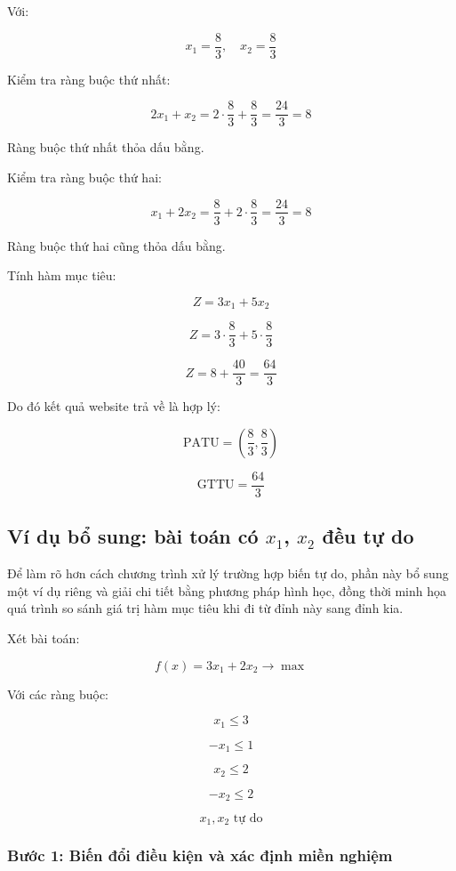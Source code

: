 \documentclass[14pt, a4paper]{extarticle}
\renewcommand{\frac}{\dfrac}
\begin{document}
    Với:
    
    \[
    x_1 = \frac{8}{3}, \quad x_2 = \frac{8}{3}
    \]
    
    Kiểm tra ràng buộc thứ nhất:
    
    \[
    2x_1+x_2 = 2\cdot\frac{8}{3}+\frac{8}{3}=\frac{24}{3}=8
    \]
    
    Ràng buộc thứ nhất thỏa dấu bằng.
    
    Kiểm tra ràng buộc thứ hai:
    
    \[
    x_1+2x_2 = \frac{8}{3}+2\cdot\frac{8}{3}=\frac{24}{3}=8
    \]
    
    Ràng buộc thứ hai cũng thỏa dấu bằng.
    
    Tính hàm mục tiêu:
    
    \[
    Z = 3x_1+5x_2
    \]
    
    \[
    Z=3\cdot\frac{8}{3}+5\cdot\frac{8}{3}
    \]
    
    \[
    Z=8+\frac{40}{3}=\frac{64}{3}
    \]
    
    Do đó kết quả website trả về là hợp lý:
    
    \[
    \boxed{\text{PATU}=\left(\frac{8}{3},\frac{8}{3}\right)}
    \]
    
    \[
    \boxed{\text{GTTU}=\frac{64}{3}}
    \]
    
    \subsection{Ví dụ bổ sung: bài toán có $x_1$, $x_2$ đều tự do}
    
    Để làm rõ hơn cách chương trình xử lý trường hợp biến tự do, phần này bổ sung một ví dụ riêng và giải chi tiết bằng phương pháp hình học, đồng thời minh họa quá trình so sánh giá trị hàm mục tiêu khi đi từ đỉnh này sang đỉnh kia.
    
    Xét bài toán:
    
    \[
    f(x)=3x_1+2x_2 \rightarrow \max
    \]
    
    Với các ràng buộc:
    
    \[
    x_1 \leq 3
    \]
    
    \[
    -x_1 \leq 1
    \]
    
    \[
    x_2 \leq 2
    \]
    
    \[
    -x_2 \leq 2
    \]
    
    \[
    x_1, x_2 \text{ tự do}
    \]
    
    \subsubsection{Bước 1: Biến đổi điều kiện và xác định miền nghiệm}
    
\end{document}

